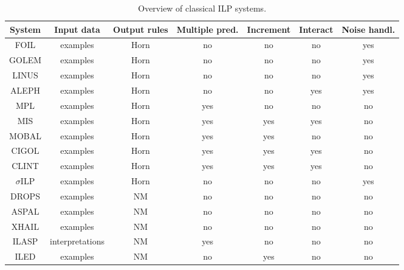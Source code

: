 \begin{table}[t]
\centering
\begin{tabular}{|c|c|c|c|c|c|c|}
\hline
System & Input data&Output rules & Multiple pred. &Increment & Interact &Noise handl.\\
\hline
FOIL \cite{foil} & examples&Horn& no &no & no  &yes \\
GOLEM \cite{golem} &examples&Horn&  no &no & no & yes \\
LINUS \cite{linus} &examples&Horn&  no& no & no & yes \\
ALEPH \cite{aleph} &examples&Horn&  no &no & yes & yes \\
MPL \cite{mpl} &examples&Horn&  yes &no & no & no \\
MIS \cite{mis} &examples&Horn&  yes &yes & yes & no \\
MOBAL \cite{mobal} &examples&Horn&  yes &yes & no & no \\
CIGOL \cite{cigol} &examples&Horn&  yes &yes & yes & no \\
CLINT \cite{clint} &examples&Horn&  yes &yes & yes & no \\
$\sigma$ILP \cite{sigmailp}&examples&Horn&no&no&no&yes\\
DROPS \cite{CorapiRL10}&examples&NM&no&no&no&no\\
ASPAL \cite{ASPAL}&examples&NM&no&no&no&no\\
XHAIL \cite{XHAIL}&examples&NM&no&no&no&no\\
ILASP \cite{ILASP_system}&interpretations&NM&yes&no&no&no\\
ILED \cite{ILED}&examples&NM&no&yes&no&no\\

\hline
\end{tabular}
\caption{Overview of classical ILP systems.}
\label{tab:ilp}
\end{table}